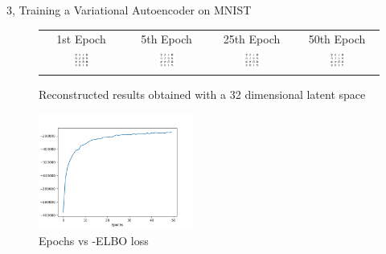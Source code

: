 \documentclass[10pt,a4paper]{article}
\begin{document}
\begin{task}{3, Training a Variational Autoencoder on MNIST}
\begin{enumerate}
\begin{figure}[H]
\caption{Reconstructed results obtained with a 32 dimensional latent space}
\label{fig:latent-32-reconstructed} 
\begin{tabular}{cccc}
	1st Epoch & 5th Epoch & 25th Epoch & 50th Epoch \\
	\includegraphics[width=0.23\textwidth]{../plots/task3/reconstructed_epochs1_latent32.png} &   \includegraphics[width=0.23\textwidth]{../plots/task3/reconstructed_epochs5_latent32.png} & \includegraphics[width=0.23\textwidth]{../plots/task3/reconstructed_epochs25_latent32.png} &   \includegraphics[width=0.23\textwidth]{../plots/task3/reconstructed_epochs50_latent32.png} \\
\end{tabular}
\end{figure}

	\begin{figure}[H]
		\caption{Epochs vs -ELBO loss}
		\label{fig:loss-latent-32}
		\centering
		\includegraphics[width=0.45\textwidth]{../plots/task3/loss_elbo_latent32.png}
	\end{figure}

\end{enumerate}
	
\end{task}
\end{document}
